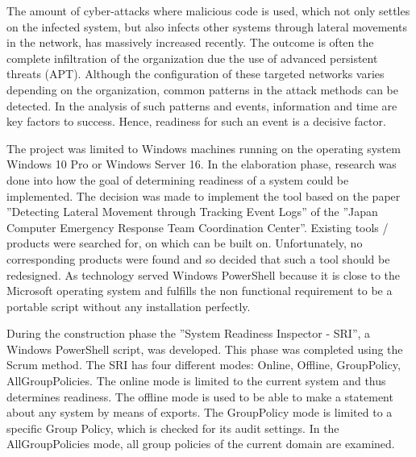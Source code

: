 
\thispagestyle{plain}
\renewcommand\section{\stdsection}
The amount of cyber-attacks where malicious code is used, which not only settles on the infected system, but also infects other systems through lateral movements in the network, has massively increased recently. The outcome is often the complete infiltration of the organization due the use of advanced persistent threats (APT). Although the configuration of these targeted networks varies depending on the organization, common patterns in the attack methods can be detected. In the analysis of such patterns and events, information and time are key factors to success. Hence, readiness for such an event is a decisive factor.

The project was limited to Windows machines running on the operating system Windows 10 Pro or Windows Server 16. In the elaboration phase, research was done into how the goal of determining readiness of a system could be implemented. The decision was made to implement the tool based on the paper ''Detecting Lateral Movement through Tracking Event Logs'' of the ''Japan Computer Emergency Response Team Coordination Center''. Existing tools / products were searched for, on which can be built on. Unfortunately, no corresponding products were found and so decided that such a tool should be redesigned. As technology served Windows PowerShell because it is close to the Microsoft operating system and fulfills the non functional requirement to be a portable script without any installation perfectly.


During the construction phase the ''System Readiness Inspector - SRI'', a Windows PowerShell script, was developed. This phase was completed using the Scrum method. The SRI has four different modes: Online, Offline, GroupPolicy, AllGroupPolicies. The online mode is limited to the current system and thus determines readiness. The offline mode is used to be able to make a statement about any system by means of exports. The GroupPolicy mode is limited to a specific Group Policy, which is checked for its audit settings. In the AllGroupPolicies mode, all group policies of the current domain are examined. 
\thispagestyle{plain}
